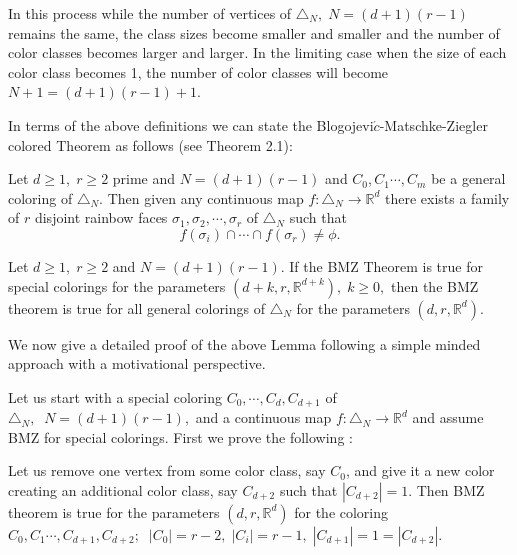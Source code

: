 \documentclass[11pt]{amsart}
\def\R{\mathbb R}
\def\t{\triangle}
\def\bn{\bigskip\noindent}
\begin{document}
\bn In this process  while  the number of vertices of $\t_N,\;N=(d+1)(r-1)$ remains the same, the class sizes become smaller and smaller and the number of color classes becomes larger and larger. In the limiting case when the size of each  color class becomes 1,  the number of color classes will become $N+1=(d+1)(r-1)+1$.

\bn In terms of the above definitions we can state the Blogojevi$\acute{c}$-Matschke-Ziegler colored Theorem as follows (see \cite{bmz} Theorem 2.1):

{  Let $d\geq 1,\; r\geq 2$ prime and $N=(d+1)(r-1)$  and $C_0,C_1\cdots ,C_m$ be a general coloring  of $\t_N$. Then given any continuous  map $f:\t_N\to\R^d$ there exists a family  of $r$ disjoint rainbow  faces $\sigma_1, \sigma_2,\cdots , \sigma_r$ of $\t_N$ such that
$$ f(\sigma_i)\cap\cdots\cap f(\sigma_r)\neq\phi.$$}

{  Let $d\geq 1,\; r\geq 2$  and $N=(d+1)(r-1).$  If the BMZ Theorem is true for special colorings for the parameters $(d+k, r, \R^{d+k}),\;k\geq 0,$ then the BMZ theorem is true for all general colorings of $\t_N$ for the parameters $(d,r,\R^d)$. }

\bn  We now give a detailed proof of the above Lemma following a simple minded approach with a motivational perspective.

\bn Let us start with a special coloring  $C_0,\cdots ,C_d, C_{d+1}$ of $\t_N,\;\;N=(d+1)(r-1),$ and a continuous map  $f:\t_N\to\R^d$ and assume BMZ for special colorings. First we prove the following :

{\Prop  Let us remove one vertex from some color class, say $C_0$, and give it a new color creating an additional color class, say $C_{d+2}$ such that $|C_{d+2}|=1$. Then BMZ theorem is true for the parameters $(d,r,\R^d)$ for the coloring  $C_0, C_1\cdots , C_{d+1},C_{d+2};\;\; |C_0|=r-2, \;|C_i|=r-1, \; |C_{d+1}|=1=|C_{d+2}|$.}
\end{document}
